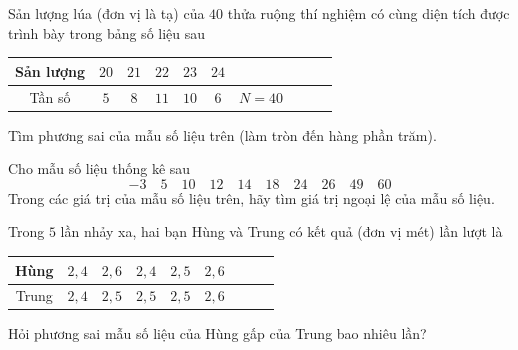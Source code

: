 \begin{ex}%
	Sản lượng lúa (đơn vị là tạ) của $40$ thửa ruộng thí nghiệm có cùng diện tích được trình bày trong bảng số liệu sau
	\begin{center}
		\begin{tabular}{|c|c|c|c|c|c|c|c|c|c|}
			\hline Sản lượng & $20$ & $21$ & $22$ & $23$ & $24$ &  \\
			\hline Tần số & $5$ & $8$ & $11$ & $10$ & $6$ & $N=40$  \\
			\hline 
		\end{tabular}
	\end{center}
	Tìm phương sai của  mẫu số liệu trên (làm tròn đến hàng phần trăm).
\end{ex}

\begin{ex}%
	Cho mẫu số liệu thống kê sau
	\[ -3 \quad 5 \quad 10 \quad 12 \quad 14 \quad 18 \quad 24 \quad 26 \quad 49 \quad 60\]
	Trong các giá trị của mẫu số liệu trên, hãy tìm giá trị ngoại lệ của mẫu số liệu.
\end{ex}

\begin{ex}%
	Trong $5$ lần nhảy xa, hai bạn Hùng và Trung có kết quả (đơn vị mét) lần lượt là
	\begin{center}
		\begin{tabular}{|c|c|c|c|c|c|c|c|c|}
			\hline Hùng & $2{,}4$ & $2{,}6$ & $2{,}4$ & $2{,}5$ & $2{,}6$   \\
			\hline Trung & $2{,}4$ & $2{,}5$ & $2{,}5$ & $2{,}5$ & $2{,}6$  \\
			\hline 
		\end{tabular}
	\end{center}
	Hỏi phương sai mẫu số liệu của Hùng gấp của Trung bao nhiêu lần?
\end{ex}


